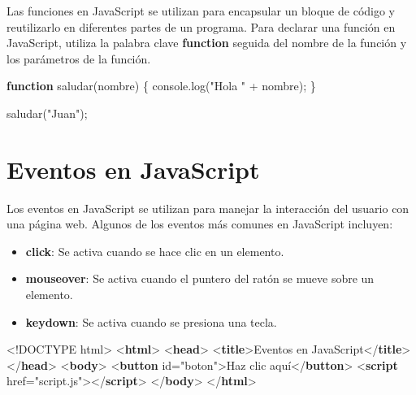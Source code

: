\documentclass[
  a4paper,
  DIV=11,
  numbers=noendperiod,
  onepage,
  openany]{scrreprt}
\newenvironment{Shaded}{\begin{snugshade}}{\end{snugshade}}
\newcommand{\BuiltInTok}[1]{\textcolor[rgb]{0.00,0.23,0.31}{#1}}
\newcommand{\DataTypeTok}[1]{\textcolor[rgb]{0.68,0.00,0.00}{#1}}
\newcommand{\FunctionTok}[1]{\textcolor[rgb]{0.28,0.35,0.67}{#1}}
\newcommand{\KeywordTok}[1]{\textcolor[rgb]{0.00,0.23,0.31}{\textbf{#1}}}
\newcommand{\NormalTok}[1]{\textcolor[rgb]{0.00,0.23,0.31}{#1}}
\newcommand{\OperatorTok}[1]{\textcolor[rgb]{0.37,0.37,0.37}{#1}}
\newcommand{\OtherTok}[1]{\textcolor[rgb]{0.00,0.23,0.31}{#1}}
\newcommand{\StringTok}[1]{\textcolor[rgb]{0.13,0.47,0.30}{#1}}
\providecommand{\tightlist}{%
  \setlength{\itemsep}{0pt}\setlength{\parskip}{0pt}}\usepackage{longtable,booktabs,array}
\begin{document}
\begin{tcolorbox}
Las funciones en JavaScript se utilizan para encapsular un bloque de
código y reutilizarlo en diferentes partes de un programa. Para declarar
una función en JavaScript, utiliza la palabra clave \textbf{function}
seguida del nombre de la función y los parámetros de la función.

\begin{Shaded}
\begin{Highlighting}[]
\KeywordTok{function} \FunctionTok{saludar}\NormalTok{(nombre) \{}
    \BuiltInTok{console}\OperatorTok{.}\FunctionTok{log}\NormalTok{(}\StringTok{"Hola "} \OperatorTok{+}\NormalTok{ nombre)}\OperatorTok{;}
\NormalTok{\}}

\FunctionTok{saludar}\NormalTok{(}\StringTok{"Juan"}\NormalTok{)}\OperatorTok{;}
\end{Highlighting}
\end{Shaded}

\section{Eventos en JavaScript}\label{eventos-en-javascript}

Los eventos en JavaScript se utilizan para manejar la interacción del
usuario con una página web. Algunos de los eventos más comunes en
JavaScript incluyen:

\begin{itemize}
\tightlist
\item
  \textbf{click}: Se activa cuando se hace clic en un elemento.
\item
  \textbf{mouseover}: Se activa cuando el puntero del ratón se mueve
  sobre un elemento.
\item
  \textbf{keydown}: Se activa cuando se presiona una tecla.
\end{itemize}

\begin{Shaded}
\begin{Highlighting}[]
\DataTypeTok{\textless{}!DOCTYPE}\NormalTok{ html}\DataTypeTok{\textgreater{}}
\DataTypeTok{\textless{}}\KeywordTok{html}\DataTypeTok{\textgreater{}}
\DataTypeTok{\textless{}}\KeywordTok{head}\DataTypeTok{\textgreater{}}
    \DataTypeTok{\textless{}}\KeywordTok{title}\DataTypeTok{\textgreater{}}\NormalTok{Eventos en JavaScript}\DataTypeTok{\textless{}/}\KeywordTok{title}\DataTypeTok{\textgreater{}}
\DataTypeTok{\textless{}/}\KeywordTok{head}\DataTypeTok{\textgreater{}}
\DataTypeTok{\textless{}}\KeywordTok{body}\DataTypeTok{\textgreater{}}
    \DataTypeTok{\textless{}}\KeywordTok{button}\OtherTok{ id}\OperatorTok{=}\StringTok{"boton"}\DataTypeTok{\textgreater{}}\NormalTok{Haz clic aquí}\DataTypeTok{\textless{}/}\KeywordTok{button}\DataTypeTok{\textgreater{}}
    \DataTypeTok{\textless{}}\KeywordTok{script}\OtherTok{ href}\OperatorTok{=}\StringTok{"script.js"}\DataTypeTok{\textgreater{}\textless{}/}\KeywordTok{script}\DataTypeTok{\textgreater{}}
\DataTypeTok{\textless{}/}\KeywordTok{body}\DataTypeTok{\textgreater{}}
\DataTypeTok{\textless{}/}\KeywordTok{html}\DataTypeTok{\textgreater{}}
\end{Highlighting}
\end{Shaded}


\end{tcolorbox}
\end{document}
